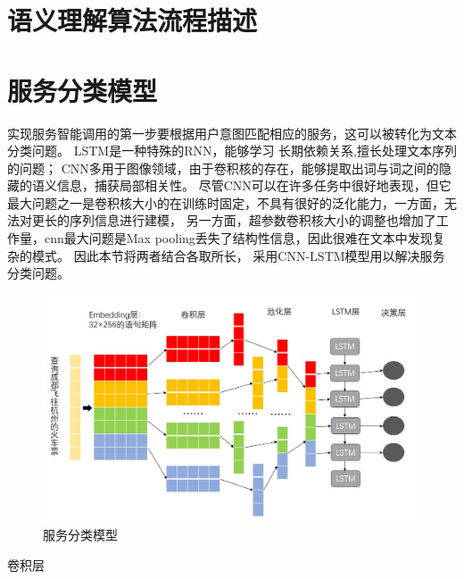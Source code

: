 \section{语义理解算法流程描述}

\section{服务分类模型}
实现服务智能调用的第一步要根据用户意图匹配相应的服务，这可以被转化为文本分类问题。
LSTM是一种特殊的RNN，能够学习 长期依赖关系,擅长处理文本序列的问题；
CNN多用于图像领域，由于卷积核的存在，能够提取出词与词之间的隐藏的语义信息，捕获局部相关性。
尽管CNN可以在许多任务中很好地表现，但它最大问题之一是卷积核大小的在训练时固定，不具有很好的泛化能力，一方面，无法对更长的序列信息进行建模，
另一方面，超参数卷积核大小的调整也增加了工作量，cnn最大问题是Max pooling丢失了结构性信息，因此很难在文本中发现复杂的模式。
因此本节将两者结合各取所长， 采用CNN-LSTM模型用以解决服务分类问题。

\begin{figure}[htbp]
    \centering
    \includegraphics[scale=0.5]{./images/cnn-lstm.jpg}
    \caption{服务分类模型}
    \label{fig:cnn-lstm}
  \end{figure}


卷积层







